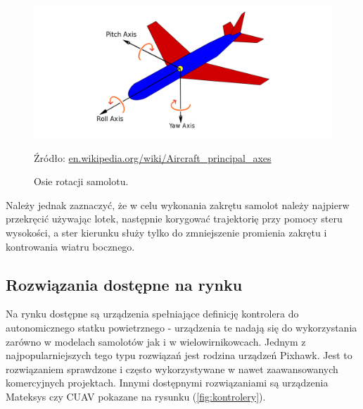 \documentclass[12pt, a4paper]{article}
\let\oldref\ref
\renewcommand{\ref}[1]{(\oldref{#1})}
\begin{document}
\begin{figure}[ht]
    \centering
    \includegraphics[width=1\textwidth]{osie}
    \caption{Osie rotacji samolotu.}
    \small Źródło: \url{en.wikipedia.org/wiki/Aircraft_principal_axes}
    \label{fig:osie}
\end{figure}

Należy jednak zaznaczyć, że w celu wykonania zakrętu samolot należy najpierw przekręcić używając lotek, następnie korygować trajektorię przy pomocy steru wysokości, a ster kierunku służy tylko do zmniejszenie promienia zakrętu i kontrowania wiatru bocznego.

\FloatBarrier
 
\subsection{Rozwiązania dostępne na rynku}
Na rynku dostępne są urządzenia spełniające definicję kontrolera do autonomicznego statku powietrznego - urządzenia te nadają się do wykorzystania zarówno w modelach samolotów jak i w wielowirnikowcach. Jednym z najpopularniejszych tego typu rozwiązań jest rodzina urządzeń Pixhawk. Jest to rozwiązaniem sprawdzone i często wykorzystywane w nawet zaawansowanych komercyjnych projektach. Innymi dostępnymi rozwiązaniami są urządzenia Mateksys czy CUAV pokazane na rysunku \ref{fig:kontrolery}.
\end{document}
